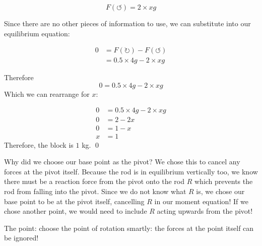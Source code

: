 \begin{solution}
    \[F(\circlearrowleft) = 2 \times xg\]

    Since there are no other pieces of information to use, we can substitute into our equilibrium equation:

    \begin{align*}
        0 &=  F(\circlearrowright) - F(\circlearrowleft) \\
         &= 0.5 \times 4g - 2 \times xg
    \end{align*}

    Therefore 
    \[ 0 = 0.5 \times 4g - 2 \times xg\]
    Which we can rearrange for $x$:

    \begin{align*}
        0 &= 0.5 \times 4g - 2 \times xg \\
        0 &= 2 - 2x \tag{canceling $g$} \\
        0 &= 1 - x \tag{dividing by $2$} \\
        x &= 1 \tag{rearranging for $x$}
    \end{align*}
    Therefore, the block is $1$ kg.
    \qed
\end{solution}

Why did we choose our base point as the pivot? We chose this to cancel any forces at the pivot itself. Because the rod is in equilibrium vertically too, we know there must be a reaction force from the pivot onto the rod $R$ which prevents 
the rod from falling into the pivot. Since we do not know what $R$ is, we chose our base point to be at the pivot itself, cancelling $R$ in our moment equation! If we chose another point, we would need to include $R$ acting upwards from the pivot!

The point: choose the point of rotation smartly: the forces at the point itself can be ignored!

